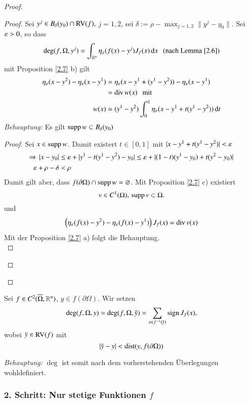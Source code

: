 \begin{proof}
\begin{description}
    \begin{proof}
        Sei $y^j\in B_\delta (y_0)\cap \mathrm{RV}(f),$ $j=1,2$, sei $\delta := \rho-\max_{j=1,2}\|y^j-y_0\|$.
        Sei $\varepsilon>0$, so dass
        \[
            \deg(f,\Omega,y^j)=\int_{\mathbb{R}^n} \eta_\varepsilon(f(x)-y^j)J_f(x) \, \mathrm{d} x \hspace{.25cm} 
            \text{(nach Lemma $\ref{2.6}$)}
        \]
        mit Proposition \ref{2.7} b) gilt
        \begin{align*}
            \eta_\varepsilon(x-y^2)-\eta_\varepsilon(x-y^1)&= \eta_\varepsilon (x-y^1+(y^1-y^2))-\eta_\varepsilon(x-y^1)\\
            &= \mathrm{div}\, w(x) \hspace{.25cm}\text{mit}\\
            w(x)&= (y^1-y^2)\int_0^1 \eta_\varepsilon (x-y^1+t(y^1-y^2))\, \mathrm{d} t
        \end{align*}
    \textit{Behauptung:} Es gilt $\mathrm{supp}\, w\subset B_\delta(y_0)$
    \begin{proof}
        Sei $x\in \mathrm{supp}\, w$. Damit existert $t\in [0,1]$ mit $|x-y^1+t(y^1-y^2)|<\varepsilon$
        \begin{align*}
            \Rightarrow \, |x-y_0|&\leq \varepsilon + |y^1-t(y^1-y^2)-y_0|\leq \varepsilon +|(1-t)(y^1-y_0)+t(y^2-y_0)|\\
                \varepsilon + \rho-\delta&<\rho
        \end{align*}
        Damit gilt aber, dass $f(\partial \Omega)\cap \mathrm{supp}\, w=\varnothing$. Mit Proposition 
        \ref{2.7} c) existiert
        \[
            v\in C^1(\Omega),\, \mathrm{supp}\, v \subset \Omega.
        \]
        und
        \[
            \left( \eta_\varepsilon(f(x)-y^2)-\eta_\varepsilon (f(x)-y^1) \right)J_f(x)=\mathrm{div}\, v(x)
        \]
        Mit der Proposition \ref{2.7} a) folgt die Behauptung. \[  \]
    \end{proof}
    \[  \]
    \end{proof}
    \end{description}
\end{proof}

\begin{defi}\label{2.9}
    Sei $f\in C^2(\overline \Omega,\mathbb{R}^n)$, $y\in f(\partial \Omega)$. Wir setzen
    \[
        \deg (f,\Omega,y)= \deg(f,\Omega,\tilde y)=\sum_{x\in f^{-1}(\tilde y)} \mathrm{sign}\, J_f(x),
    \]
    wobei $\tilde y \in \mathrm{RV}(f)$ mit
    \[
        |\tilde y- y| < \mathrm{dist}(y,f(\partial \Omega))
    \]
\end{defi}

\noindent\textit{Behauptung:} $\deg$ ist somit nach dem vorherstehenden Überlegungen wohldefiniert.

\subsubsection*{2. Schritt: Nur stetige Funktionen $f$}

